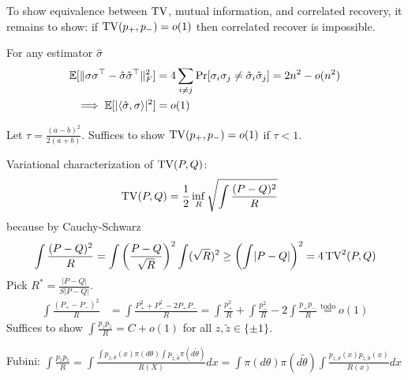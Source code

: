 To show equivalence between $\operatorname{TV}$, mutual information, and correlated recovery, it remains to show:
if $\operatorname{TV}(p_+, p_-) = o(1)$ then correlated recover is impossible.

For any estimator $\hat\sigma$
\begin{align}
  \ex[\|\sigma \sigma^\top - \hat\sigma \hat\sigma^\top\|_F^2]
  &=  4 \sum_{i \neq j} \Pr[\sigma_i \sigma_j \neq \hat\sigma_i \hat\sigma_j]
  = 2 n^2 - o(n^2) \\
  \implies \ex[\lvert \braket{\hat\sigma, \sigma}\rvert^2] &= o(1)

\end{align}

\begin{theorem}
  Let $\tau = \frac{(a-b)^2}{2(a+b)}$. Suffices to show $\operatorname{TV}(p_+, p_-) = o(1)$
  if $\tau < 1$.

  Variational characterization of $\operatorname{TV}(P,Q)$:
  \begin{align}
    \operatorname{TV}(P,Q) &= \frac{1}{2} \inf_R \sqrt{\int \frac{(P-Q)^2}{R} }
  \end{align}
  because by Cauchy-Schwarz
  \begin{align}
    \int \frac{(P-Q)^2}{R}
    = \int \left(\frac{P-Q}{\sqrt{R}} \right)^2 \int (\sqrt{R})^2
    \geq \left(\int \lvert P - Q \rvert\right)^2 = 4 \operatorname{TV}^2(P,Q)
  \end{align}
  Pick $R^* = \frac{\lvert P - Q \rvert}{S \lvert P - Q \rvert} $.
  \begin{align}
    \int \frac{(P_+ - P_-)^2}{R}
    &= \int \frac{P_+^2 + P_-^2 - 2 P_+ P_-}{R}
    = \int \frac{p_+^2}{R}  + \int \frac{p_-^2}{R}  - 2 \int \frac{p_+ p_-}{R}
    \overset{\text{todo}}{=} o(1)
  \end{align}
  Suffices to show $\int \frac{p_z p_{\tilde{z}}}{R} = C + o(1)$ for all
  $z,\tilde{z} \in \{\pm1\}$.

  Fubini: $\int \frac{p_z p_{\tilde{z}}}{R}
  = \int \frac{\int p_{z,\theta}(x) \pi(d\theta) \int p_{\tilde{z},\tilde\theta} \pi(d\tilde\theta)}{R(X)} dx
    = \int \pi(d\theta) \pi(d\tilde\theta) \int \frac{p_{z,\theta}(x) p_{\tilde{z}, \tilde{\theta}}(x)}{R(x)} dx$


\end{theorem}
